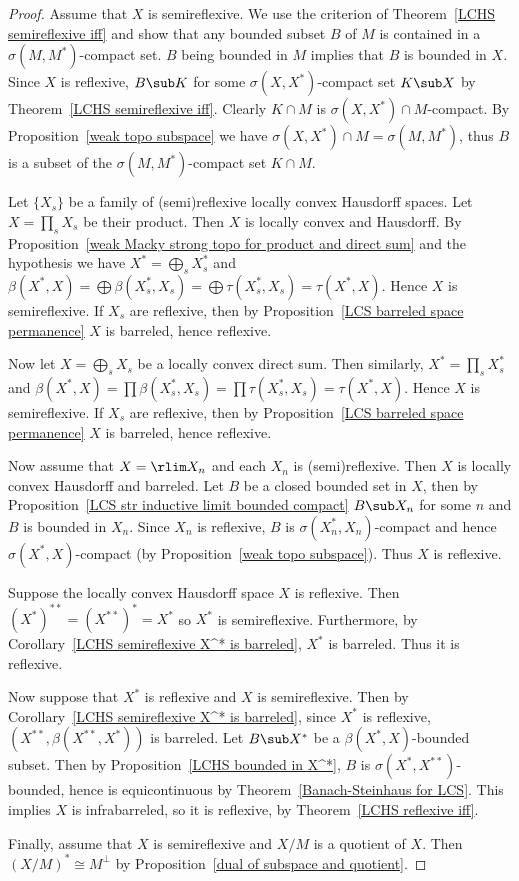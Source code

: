 \begin{proof}
Assume that $X$ is semireflexive. We use the criterion of Theorem~\ref{LCHS semireflexive iff} and show that any bounded subset $B$ of $M$ is contained in a $\sigma(M,M^*)$-compact set. $B$ being bounded in $M$ implies that $B$ is bounded in $X$. Since $X$ is reflexive, $B\sub K$ for some $\sigma(X,X^*)$-compact set $K\sub X$ by Theorem~\ref{LCHS semireflexive iff}. Clearly $K\cap M$ is $\sigma(X,X^*)\cap M$-compact. By Proposition~\ref{weak topo subspace} we have $\sigma(X,X^*)\cap M=\sigma(M,M^*)$, thus $B$ is a subset of the $\sigma(M,M^*)$-compact set $K\cap M$.\par
Let $\{X_s\}$ be a family of (semi)reflexive locally convex Hausdorff spaces. Let $X=\prod_sX_s$ be their product. Then $X$ is locally convex and Hausdorff. By Proposition~\ref{weak Macky strong topo for product and direct sum} and the hypothesis we have $X^*=\bigoplus_sX_s^*$ and $\beta(X^*,X)=\bigoplus\beta(X_s^*,X_s)=\bigoplus\tau(X_s^*,X_s)=\tau(X^*,X)$. Hence $X$ is semireflexive. If $X_s$ are reflexive, then by Proposition~\ref{LCS barreled space permanence} $X$ is barreled, hence reflexive.\par
Now let $X=\bigoplus_sX_s$ be a locally convex direct sum. Then similarly, $X^*=\prod_sX_s^*$ and $\beta(X^*,X)=\prod\beta(X_s^*,X_s)=\prod\tau(X_s^*,X_s)=\tau(X^*,X)$. Hence $X$ is semireflexive. If $X_s$ are reflexive, then by Proposition~\ref{LCS barreled space permanence} $X$ is barreled, hence reflexive.\par
Now assume that $X=\rlim X_n$ and each $X_n$ is (semi)reflexive. Then $X$ is locally convex Hausdorff and barreled. Let $B$ be a closed bounded set in $X$, then by Proposition~\ref{LCS str inductive limit bounded compact} $B\sub X_n$ for some $n$ and $B$ is bounded in $X_n$. Since $X_n$ is reflexive, $B$ is $\sigma(X_n^*,X_n)$-compact and hence $\sigma(X^*,X)$-compact (by Proposition~\ref{weak topo subspace}). Thus $X$ is reflexive.\par
Suppose the locally convex Hausdorff space $X$ is reflexive. Then $(X^*)^{**}=(X^{**})^{*}=X^*$ so $X^*$ is semireflexive. Furthermore, by Corollary~\ref{LCHS semireflexive X^* is barreled}, $X^*$ is barreled. Thus it is reflexive.\par
Now suppose that $X^*$ is reflexive and $X$ is semireflexive. Then by Corollary~\ref{LCHS semireflexive X^* is barreled}, since $X^*$ is reflexive, $(X^{**},\beta(X^{**},X^*))$ is barreled. Let $B\sub X^*$ be a $\beta(X^*,X)$-bounded subset. Then by Proposition~\ref{LCHS bounded in X^*}, $B$ is $\sigma(X^*,X^{**})$-bounded, hence is equicontinuous by Theorem~\ref{Banach-Steinhaus for LCS}. This implies $X$ is infrabarreled, so it is reflexive, by Theorem~\ref{LCHS reflexive iff}.\par
Finally, assume that $X$ is semireflexive and $X/M$ is a quotient of $X$. Then $(X/M)^*\cong M^\bot$ by Proposition~\ref{dual of subspace and quotient}. 
\end{proof}
